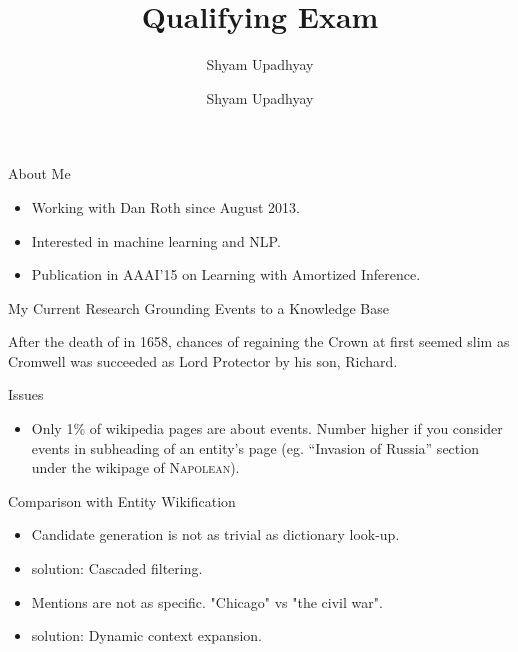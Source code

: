 

\author{Shyam Upadhyay}
\title{Qualifying Exam}

\date{Shyam Upadhyay} 



\begin{frame}
\titlepage
\end{frame}

\begin{frame}{About Me}
\begin{itemize}
\item Working with Dan Roth since August 2013.
\item Interested in machine learning and NLP.
\item Publication in AAAI'15 on Learning with Amortized Inference.
\end{itemize}
\end{frame}

\begin{frame}{My Current Research}
Grounding Events to a Knowledge Base
\begin{block}{}
After the {\color{blue} death of } in 1658,  chances of regaining the Crown at first seemed slim as Cromwell was succeeded as Lord Protector by his son, Richard.
\end{block}
\end{frame}

\begin{frame}{Issues}
\begin{itemize}
\item Only 1\% of wikipedia pages are about events. Number higher if you consider events in subheading of an entity's page (eg. ``Invasion of Russia'' section under the wikipage of \textsc{Napolean}).
\end{itemize}
\end{frame}

\begin{frame}{Comparison with Entity Wikification}
\begin{itemize}
\item Candidate generation is not as trivial as dictionary look-up.
\pause
\item {\color{red}solution:} Cascaded filtering.
\pause
\item Mentions are not as specific. "Chicago" vs "the civil war".
\pause
\item {\color{red}solution:} Dynamic context expansion.
\end{itemize}
\end{frame}

